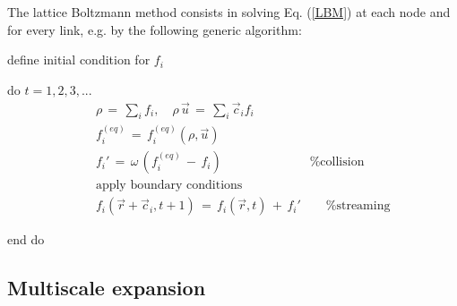 The lattice Boltzmann method consists in solving Eq. (\ref{LBM}) at each node and for every link, e.g. by the following generic algorithm:\\[1ex]
\par
define initial condition for $f_i$\par
do $t=1,2,3,...$
\begin{eqnarray}
 &&\rho \,=\, \sum_i f_i , \quad \rho \,\vec u\,=\, \sum_i \vec c_i f_i\nonumber \\
 &&f_i^{(eq)}\,=\,f_i^{(eq)}(\rho, \vec u) \\ \nonumber
 &&f_i' \,=\, \omega \, (f_i^{(eq)}\, -\, f_i )\quad \quad \quad \quad \quad \quad \quad \mbox{\% collision}\\ \nonumber
 &&\mbox{apply boundary conditions}\\ \nonumber
 &&f_i (\vec r + \vec c_i, t+1)\,=\, f_i(\vec r , t) \, + \, f_i'\quad \quad \mbox{\% streaming} \nonumber
\end{eqnarray}\par
end do\\[1ex]

\subsection{Multiscale expansion}

